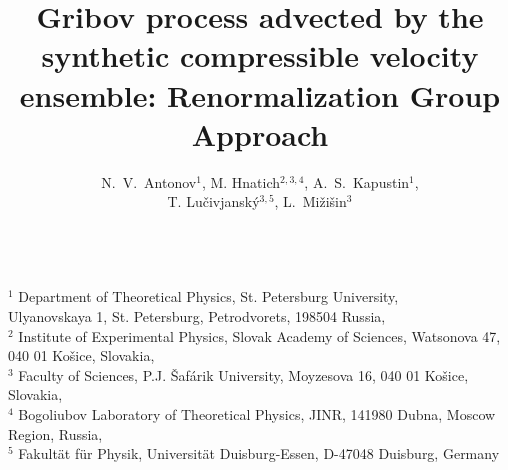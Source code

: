 \documentclass[12pt]{article}
\begin{document}
\title{Gribov process advected by the synthetic compressible velocity
ensemble: Renormalization Group Approach}

\author{N.~V.~Antonov$^{1}$, M. Hnatich$^{2,3,4}$, A.~S.~Kapustin$^{1}$,\\ T. Lu\v{c}ivjansk\'y$^{3,5}$, L.~Mi\v{z}i\v{s}in$^{3}$}

\maketitle\mbox{ }
\\
 $^{1}$ Department of Theoretical Physics, St. Petersburg 
University,\\Ulyanovskaya 1, St. Petersburg, Petrodvorets, 198504 Russia,\\
 $^{2}$ Institute of Experimental
Physics, Slovak Academy of Sciences, Watsonova 47, 040 01
Ko\v{s}ice, Slovakia,\\
$^{3}$ Faculty of Sciences, P.J. \v{S}af\'arik
University, Moyzesova 16, 040 01 Ko\v{s}ice, Slovakia,\\
$^4$ Bogoliubov Laboratory of Theoretical Physics, JINR, 141980 Dubna, Moscow Region, Russia,\\
$^{5}$ Fakult\"at f\"ur Physik, Universit\"at Duisburg-Essen, D-47048 Duisburg, Germany\\
\end{document}
